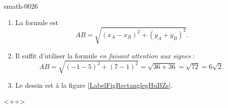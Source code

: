 
\begin{corrige}{smath-0026}

    \begin{enumerate}
        \item
            La formule est
            \begin{equation}
                AB=\sqrt{  (x_A-x_B)^2+(y_A+y_B)^2 }.
            \end{equation}
        \item
            Il suffit d'utiliser la formule \emph{en faisant attention aux signes} :
            \begin{equation}
                AB=\sqrt{  (-1-5)^2+(7-1)^2 }=\sqrt{36+36}=\sqrt{72}=6\sqrt{2}.
            \end{equation}
        \item
            Le dessin est à la figure \ref{LabelFigRectanglegHuBZs}. %
            \newcommand{\CaptionFigRectanglegHuBZs}{Le triangle de l'exercice \ref{exosmath-0026}.}
            


    \end{enumerate}
    <++>

\end{corrige}

